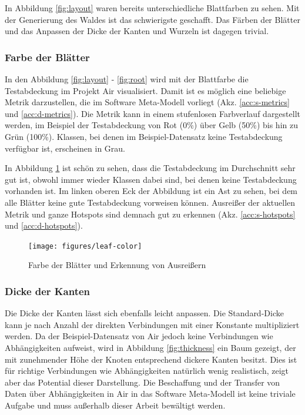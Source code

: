In Abbildung \ref{fig:layout} waren bereits unterschiedliche Blattfarben zu sehen. Mit der Generierung des Waldes ist das schwierigste geschafft. Das Färben der Blätter und das Anpassen der Dicke der Kanten und Wurzeln ist dagegen trivial.

\subsubsection*{Farbe der Blätter}

In den Abbildung \ref{fig:layout} - \ref{fig:root} wird mit der Blattfarbe die Testabdeckung im Projekt Air visualisiert. Damit ist es möglich eine beliebige Metrik darzustellen, die im Software Meta-Modell vorliegt (Akz. \ref{acc:s-metrics} und \ref{acc:d-metrics}). Die Metrik kann in einem stufenlosen Farbverlauf dargestellt werden, im Beispiel der Testabdeckung von Rot (0\%) über Gelb (50\%) bis hin zu Grün (100\%). Klassen, bei denen im Beispiel-Datensatz keine Testabdeckung verfügbar ist, erscheinen in Grau.

In Abbildung \ref{fig:leaf-color} ist schön zu sehen, dass die Testabdeckung im Durchschnitt sehr gut ist, obwohl immer wieder Klassen dabei sind, bei denen keine Testabdeckung vorhanden ist. Im linken oberen Eck der Abbildung ist ein Ast zu sehen, bei dem alle Blätter keine gute Testabdeckung vorweisen können. Ausreißer der aktuellen Metrik und ganze Hotspots sind demnach gut zu erkennen (Akz. \ref{acc:s-hotspots} und \ref{acc:d-hotspots}).

\begin{figure}[htb]
  \texttt{[image: figures/leaf-color]}
  \caption{Farbe der Blätter und Erkennung von Ausreißern}
  \label{fig:leaf-color}
\end{figure}

\subsubsection*{Dicke der Kanten}

Die Dicke der Kanten lässt sich ebenfalls leicht anpassen. Die Standard-Dicke kann je nach Anzahl der direkten Verbindungen mit einer Konstante multipliziert werden. Da der Beispiel-Datensatz von Air jedoch keine Verbindungen wie Abhängigkeiten aufweist, wird in Abbildung \ref{fig:thickness} ein Baum gezeigt, der mit zunehmender Höhe der Knoten entsprechend dickere Kanten besitzt. Dies ist für richtige Verbindungen wie Abhängigkeiten natürlich wenig realistisch, zeigt aber das Potential dieser Darstellung. Die Beschaffung und der Transfer von Daten über Abhängigkeiten in Air in das Software Meta-Modell ist keine triviale Aufgabe und muss außerhalb dieser Arbeit bewältigt werden.

